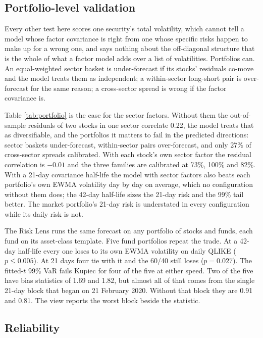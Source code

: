 \documentclass[11pt,a4paper]{article}
\begin{document}
\subsection{Portfolio-level validation}
\label{sec:portfolio}

Every other test here scores one security's total volatility, which cannot tell a
model whose factor covariance is right from one whose specific risks happen to make
up for a wrong one, and says nothing about the off-diagonal structure that is the
whole of what a factor model adds over a list of volatilities. Portfolios can. An
equal-weighted sector basket is under-forecast if its stocks' residuals co-move and
the model treats them as independent; a within-sector long-short pair is
over-forecast for the same reason; a cross-sector spread is wrong if the factor
covariance is.



Table \ref{tab:portfolio} is the case for the sector factors. Without them the
out-of-sample residuals of two stocks in one sector correlate 0.22, the model
treats that as diversifiable, and the portfolios it matters to fail in the
predicted directions: sector baskets under-forecast, within-sector pairs
over-forecast, and only 27\% of cross-sector spreads calibrated. With each stock's
own sector factor the residual correlation is $-0.01$ and the three families are
calibrated at 73\%, 100\% and 82\%. With a 21-day covariance half-life the model
with sector factors also beats each portfolio's own EWMA volatility day by day on
average, which no configuration without them does; the 42-day half-life sizes the
21-day risk and the 99\% tail better. The market portfolio's 21-day risk is
understated in every configuration while its daily risk is not.

The Risk Lens runs the same forecast on any portfolio of stocks and funds, each
fund on its asset-class template. Five fund portfolios repeat the trade. At a
42-day half-life every one loses to its own EWMA volatility on daily QLIKE
($p \le 0.005$). At 21 days four tie with it and the 60/40 still loses
($p = 0.027$). The fitted-$t$ 99\% VaR fails Kupiec for four of the five at either
speed. Two of the five have bias statistics of 1.69 and 1.82, but almost all of
that comes from the single 21-day block that began on 21 February 2020. Without
that block they are 0.91 and 0.81. The view reports the worst block beside the
statistic.

\subsection{Reliability}
\label{sec:reliability}
\end{document}
